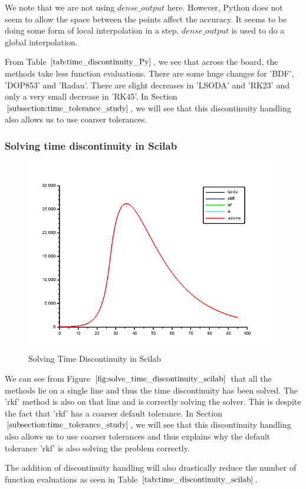 We note that we are not using $dense\_output$ here. However, Python does not seem to allow the space between the points affect the accuracy. It seems to be doing some form of local interpolation in a step. $dense\_output$ is used to do a global interpolation.

From Table $\ref{tab:time_discontinuity_Py}$, we see that across the board, the methods take less function evaluations. There are some huge changes for 'BDF', 'DOP853' and 'Radau'. There are slight decreases in 'LSODA' and 'RK23' and only a very small decrease in 'RK45'. In Section $\ref{subsection:time_tolerance_study}$, we will see that this discontinuity handling also allows us to use coarser tolerances.

\subsubsection{Solving time discontinuity in Scilab} 
\begin{figure}[h]
	\centering
	\includegraphics[width=0.7\linewidth]{./figures/solve_time_discontinuity_scilab}
	\caption{Solving Time Discontinuity in Scilab}
	\label{fig:solve_time_discontinuity_scilab}
\end{figure}
We can see from Figure $\ref{fig:solve_time_discontinuity_scilab}$ that all the methods lie on a single line and thus the time discontinuity has been solved. The 'rkf' method is also on that line and is correctly solving the solver. This is despite the fact that 'rkf' has a coarser default tolerance. In Section $\ref{subsection:time_tolerance_study}$, we will see that this discontinuity handling also allows us to use coarser tolerances and thus explains why the default tolerance 'rkf' is also solving the problem correctly.

The addition of discontinuity handling will also drastically reduce the number of function evaluations as seen in Table $\ref{tab:time_discontinuity_scilab}$.

